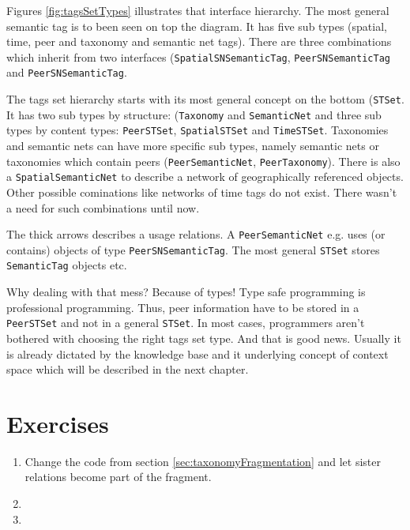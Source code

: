 Figures \ref{fig:tagsSetTypes} illustrates that interface hierarchy. The most general semantic tag is to been seen on top the diagram. It has five sub types (spatial, time, peer and taxonomy and semantic net tags). There are three combinations which inherit from two interfaces 
({\tt SpatialSNSemanticTag}, {\tt PeerSNSemanticTag} and 
{\tt PeerSNSemanticTag}.

The tags set hierarchy starts with its most general concept on the bottom ({\tt STSet}. It has two sub types by structure: ({\tt Taxonomy} and {\tt SemanticNet} and three sub types by content types: {\tt PeerSTSet}, {\tt SpatialSTSet} and {\tt TimeSTSet}. Taxonomies and semantic nets can have more specific sub types, namely semantic nets or taxonomies which contain peers ({\tt PeerSemanticNet}, {\tt PeerTaxonomy}). There is also a {\tt SpatialSemanticNet} to describe a network of geographically referenced objects. Other possible cominations like networks of time tags do not exist. There wasn't a need for such combinations until now.

The thick arrows describes a usage relations. A {\tt PeerSemanticNet} e.g. uses (or contains) objects of type {\tt PeerSNSemanticTag}. The most general {\tt STSet} stores {\tt SemanticTag} objects etc.

Why dealing with that mess? Because of types! Type safe programming is professional programming. Thus, peer information have to be stored in a {\tt PeerSTSet} and not in a general {\tt STSet}. In most cases, programmers aren't bothered with choosing the right tags set type. And that is good news. Usually it is already dictated by the knowledge base and it underlying concept of context space which will be described in the next chapter.

\section{Exercises}
\begin{enumerate}
\item 
Change the code from section \ref{sec:taxonomyFragmentation} and let sister relations become part of the fragment.
\item 
\item 

\end{enumerate}

